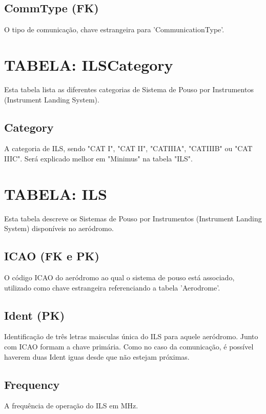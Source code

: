 \subsection{CommType (FK)}
O tipo de comunicação, chave estrangeira para 'CommunicationType'.


\section{TABELA: ILSCategory}

Esta tabela lista as diferentes categorias de Sistema de Pouso por Instrumentos
 (Instrument Landing System).

\subsection{Category}

A categoria de ILS, sendo "CAT I", "CAT II", "CATIIIA", "CATIIIB" ou
 "CAT IIIC". Será explicado melhor em "Minimus" na tabela "ILS".

\section{TABELA: ILS}

Esta tabela descreve os Sistemas de Pouso por Instrumentos (Instrument
Landing System) disponíveis no aeródromo.

\subsection{ICAO (FK e PK)}

O código ICAO do aeródromo ao qual o sistema de pouso está associado, utilizado 
como chave estrangeira referenciando a tabela 'Aerodrome'.

\subsection{Ident (PK)}

Identificação de três letras maisculas única do ILS para aquele aeródromo.
Junto com ICAO formam a chave primária. Como no caso da comunicação, é
possível haverem duas Ident iguas desde que não estejam próximas.

\subsection{Frequency}

A frequência de operação do ILS em MHz.

